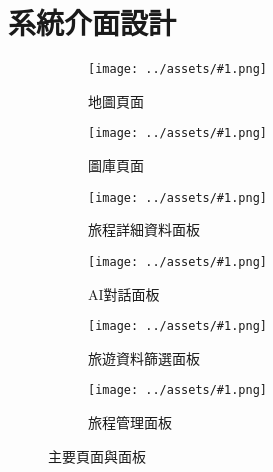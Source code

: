 
\section{系統介面設計}

\newcommand{\customsubfig}[2]{
  \begin{subfigure}[t]{0.20\textwidth}
    \centering
    \texttt{[image: ../assets/\#1.png]}
    \caption{#2}
    \label{#2}
  \end{subfigure}
}

\begin{figure}[H]
  \centering
  \customsubfig{地圖頁面}{地圖頁面}
  \customsubfig{圖庫頁面}{圖庫頁面}
  \customsubfig{旅程詳細資料面板-統計資料}{旅程詳細資料面板}
  \customsubfig{AI對話面板-聊天}{AI對話面板}
  \customsubfig{旅遊資料篩選面板}{旅遊資料篩選面板}
  \customsubfig{旅程管理面板}{旅程管理面板}
  \caption{主要頁面與面板}
  \label{主要頁面與面板}
\end{figure}

